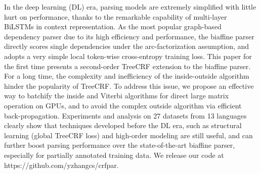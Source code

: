 In the deep learning (DL) era, parsing models are extremely simplified with little hurt on performance, thanks to the remarkable capability of multi-layer BiLSTMs in context representation. As the most popular graph-based dependency parser due to its high efficiency and performance, the biaffine parser directly scores single dependencies under the arc-factorization assumption, and adopts a very simple local token-wise cross-entropy training loss. This paper for the first time presents a second-order TreeCRF extension to the biaffine parser. For a long time, the complexity and inefficiency of the inside-outside algorithm hinder the popularity of TreeCRF. To address this issue, we propose an effective way to batchify the inside and Viterbi algorithms for direct large matrix operation on GPUs, and to avoid the complex outside algorithm via efficient back-propagation. Experiments and analysis on 27 datasets from 13 languages clearly show that techniques developed before the DL era, such as structural learning (global TreeCRF loss) and high-order modeling are still useful, and can further boost parsing performance over the state-of-the-art biaffine parser, especially for partially annotated training data. We release our code at https://github.com/yzhangcs/crfpar.
